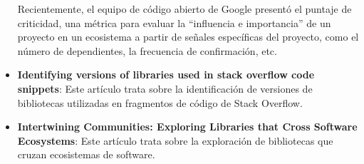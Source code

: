 \begin{itemize}
          Recientemente, el equipo de código abierto de Google presentó el puntaje de criticidad, una métrica para evaluar la
          “influencia e importancia” de un proyecto en un ecosistema a partir de señales específicas del proyecto, como el número
          de dependientes, la frecuencia de confirmación, etc.
    \item \textbf{Identifying versions of libraries used in stack overflow code snippets}\cite{zerouali2021identifying}:
          Este artículo trata sobre la identificación de versiones de bibliotecas utilizadas en fragmentos de código de Stack Overflow.
    \item \textbf{Intertwining Communities: Exploring Libraries that Cross Software Ecosystems}\cite{kannee2023intertwining}:
          Este artículo trata sobre la exploración de bibliotecas que cruzan ecosistemas de software.
\end{itemize}